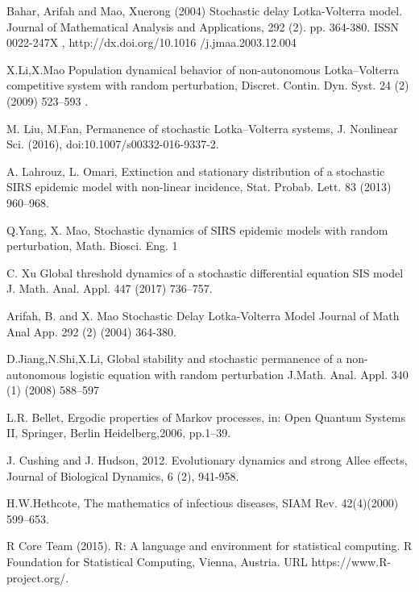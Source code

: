 \begin{thebibliography}{00}
Bahar, Arifah and Mao, Xuerong (2004) 
\newblock Stochastic delay Lotka-Volterra model. 
\newblock Journal of Mathematical Analysis and Applications, 292 (2). pp. 364-380. ISSN 0022-247X , http://dx.doi.org/10.1016
/j.jmaa.2003.12.004

 X.Li,X.Mao
\newblock Population dynamical behavior of non-autonomous Lotka–Volterra competitive system with random perturbation, 
\newblock Discret. Contin. Dyn. Syst. 24 (2) (2009) 523–593 .

 M. Liu, M.Fan, 
\newblock Permanence of stochastic Lotka–Volterra systems,
\newblock J. Nonlinear Sci. (2016), doi:10.1007/s00332-016-9337-2.

 A. Lahrouz, L. Omari,
\newblock Extinction and stationary distribution of a stochastic SIRS epidemic model with non-linear incidence,
\newblock Stat. Probab. Lett. 83 (2013) 960–968.

 Q.Yang, X. Mao,
\newblock Stochastic dynamics of SIRS epidemic models with random perturbation,
\newblock Math. Biosci. Eng. 1

 C. Xu
\newblock Global threshold dynamics of a stochastic differential equation SIS model
\newblock J. Math. Anal. Appl. 447 (2017) 736–757.

Arifah, B. and X. Mao 
\newblock Stochastic Delay Lotka-Volterra Model 
\newblock Journal of Math Anal App. 292 (2) (2004) 364-380.

 D.Jiang,N.Shi,X.Li,
\newblock Global stability and stochastic permanence of a non-autonomous logistic equation with random perturbation
\newblock J.Math. Anal. Appl. 340 (1) (2008) 588–597

L.R. Bellet,
\newblock Ergodic properties of Markov processes, in: Open Quantum Systems II,
\newblock Springer, Berlin Heidelberg,2006, pp.1–39.

 J. Cushing and J. Hudson, 2012. 
\newblock Evolutionary dynamics and strong Allee effects,
\newblock Journal  of  Biological Dynamics, 6 (2), 941-958.

H.W.Hethcote,
\newblock The mathematics of infectious diseases,
\newblock SIAM Rev. 42(4)(2000) 599–653.


R Core Team (2015). 
\newblock R: A language and environment for statistical computing. R Foundation for Statistical Computing, Vienna, Austria.
\newblock URL https://www.R-project.org/.


\end{thebibliography}

